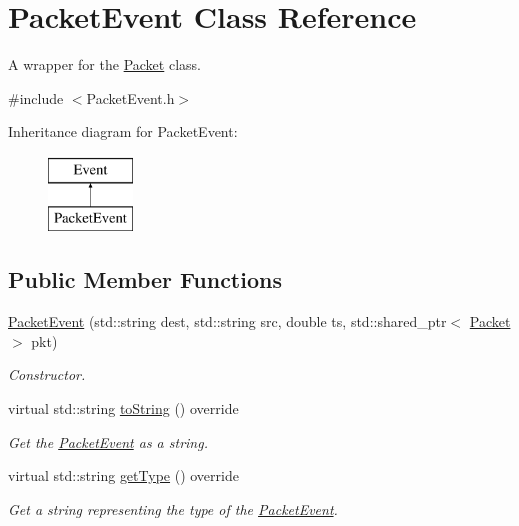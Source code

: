 \hypertarget{classPacketEvent}{\section{\-Packet\-Event \-Class \-Reference}
\label{classPacketEvent}
}


\-A wrapper for the \hyperlink{classPacket}{\-Packet} class.  




{\ttfamily \#include $<$\-Packet\-Event.\-h$>$}

\-Inheritance diagram for \-Packet\-Event\-:\begin{figure}[H]
\begin{center}
\leavevmode
\includegraphics[height=2.000000cm]{classPacketEvent}
\end{center}
\end{figure}
\subsection*{\-Public \-Member \-Functions}
\begin{DoxyCompactItemize}
\item 
\hyperlink{classPacketEvent_a3e70db575746c33aed7bb62b0ad62c85}{\-Packet\-Event} (std\-::string dest, std\-::string src, double ts, std\-::shared\-\_\-ptr$<$ \hyperlink{classPacket}{\-Packet} $>$ pkt)
\begin{DoxyCompactList}\small\item\em \-Constructor. \end{DoxyCompactList}\item 
virtual std\-::string \hyperlink{classPacketEvent_a4e863687bff18562aed034422393295c}{to\-String} () override
\begin{DoxyCompactList}\small\item\em \-Get the \hyperlink{classPacketEvent}{\-Packet\-Event} as a string. \end{DoxyCompactList}\item 
virtual std\-::string \hyperlink{classPacketEvent_a7dfa4c479200db12df64a12bc39d22d8}{get\-Type} () override
\begin{DoxyCompactList}\small\item\em \-Get a string representing the type of the \hyperlink{classPacketEvent}{\-Packet\-Event}. \end{DoxyCompactList}\end{DoxyCompactItemize}
